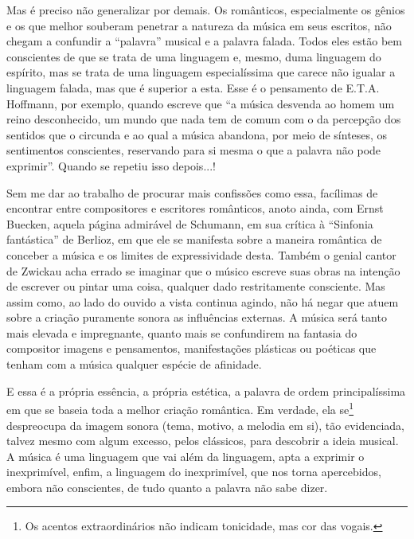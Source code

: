 Mas é preciso não generalizar por demais. Os românticos, especialmente
os gênios e os que melhor souberam penetrar a natureza da música em seus
escritos, não chegam a confundir a ``palavra'' musical e a palavra
falada. Todos eles estão bem conscientes de que se trata de uma
linguagem e, mesmo, duma linguagem do espírito, mas se trata de uma
linguagem especialíssima que carece não igualar a linguagem falada, mas
que é superior a esta. Esse é o pensamento de E.T.A. Hoffmann, por
exemplo, quando escreve que ``a música desvenda ao homem um reino
desconhecido, um mundo que nada tem de comum com o da percepção dos
sentidos que o circunda e ao qual a música abandona, por meio de
sínteses, os sentimentos conscientes, reservando para si mesma o que a
palavra não pode exprimir''. Quando se repetiu isso depois...!

Sem me dar ao trabalho de procurar mais confissões como essa, facílimas
de encontrar entre compositores e escritores românticos, anoto ainda,
com Ernst Buecken, aquela página admirável de Schumann, em sua crítica à
``Sinfonia fantástica'' de Berlioz, em que ele se manifesta sobre a
maneira romântica de conceber a música e os limites de expressividade
desta. Também o genial cantor de Zwickau acha errado se imaginar que o
músico escreve suas obras na intenção de escrever ou pintar uma coisa,
qualquer dado restritamente consciente. Mas assim como, ao lado do
ouvido a vista continua agindo, não há negar que atuem sobre a criação
puramente sonora as influências externas. A música será tanto mais
elevada e impregnante, quanto mais se confundirem na fantasia do
compositor imagens e pensamentos, manifestações plásticas ou poéticas
que tenham com a música qualquer espécie de afinidade.

E essa é a própria essência, a própria estética, a palavra de ordem
principalíssima em que se baseia toda a melhor criação romântica. Em
verdade, ela se\footnote{Os acentos extraordinários não indicam tonicidade, mas cor das
vogais.} despreocupa da imagem sonora (tema, motivo, a melodia
em si), tão evidenciada, talvez mesmo com algum excesso, pelos
clássicos, para descobrir a ideia musical. A música é uma linguagem que
vai além da linguagem, apta a exprimir o inexprimível, enfim, a
linguagem do inexprimível, que nos torna apercebidos, embora não
conscientes, de tudo quanto a palavra não sabe dizer.

